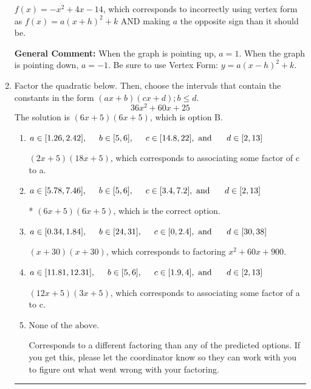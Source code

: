 \documentclass{extbook}[14pt]
\newcommand{\litem}[1]{\item #1

\rule{\textwidth}{0.4pt}}
\begin{document}
\begin{enumerate}
{\begin{enumerate}[label=\Alph*.]
$f(x)=-x^{2} +4 x -14$, which corresponds to incorrectly using vertex form as $f(x) = a(x+h)^2+k$ AND making $a$ the opposite sign than it should be.
\end{enumerate}

\textbf{General Comment:} When the graph is pointing up, $a=1$. When the graph is pointing down, $a=-1$. Be sure to use Vertex Form: $y = a(x-h)^2+k$.
}
\litem{
Factor the quadratic below. Then, choose the intervals that contain the constants in the form $(ax+b)(cx+d); b \leq d.$
\[ 36x^{2} +60 x + 25 \]The solution is \( (6x + 5)(6x + 5) \), which is option B.\begin{enumerate}[label=\Alph*.]
\item \( a \in [1.26, 2.42], \hspace*{5mm} b \in [5, 6], \hspace*{5mm} c \in [14.8, 22], \text{ and } \hspace*{5mm} d \in [2, 13] \)

 $(2x + 5)(18x + 5)$, which corresponds to associating some factor of c to a.
\item \( a \in [5.78, 7.46], \hspace*{5mm} b \in [5, 6], \hspace*{5mm} c \in [3.4, 7.2], \text{ and } \hspace*{5mm} d \in [2, 13] \)

* $(6x + 5)(6x + 5)$, which is the correct option.
\item \( a \in [0.34, 1.84], \hspace*{5mm} b \in [24, 31], \hspace*{5mm} c \in [0, 2.4], \text{ and } \hspace*{5mm} d \in [30, 38] \)

 $(x + 30)(x + 30)$, which corresponds to factoring $x^{2} +60 x + 900$.
\item \( a \in [11.81, 12.31], \hspace*{5mm} b \in [5, 6], \hspace*{5mm} c \in [1.9, 4], \text{ and } \hspace*{5mm} d \in [2, 13] \)

 $(12x + 5)(3x + 5)$, which corresponds to associating some factor of a to c.
\item \( \text{None of the above.} \)

 Corresponds to a different factoring than any of the predicted options. If you get this, please let the coordinator know so they can work with you to figure out what went wrong with your factoring.
\end{enumerate}

}
\end{enumerate}
\end{document}
